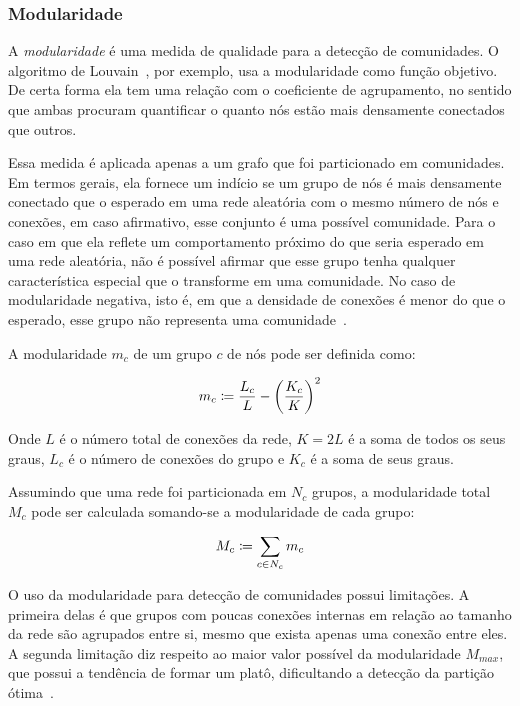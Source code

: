 \documentclass[12pt,a4paper]{article}
\begin{document}
\subsubsection{Modularidade} \label{sec:modularidade}


A \textit{modularidade} é uma medida de qualidade para a detecção de comunidades. O algoritmo de Louvain~\cite{Blondel2008-qh}, por exemplo, usa a modularidade como função objetivo. De certa forma ela tem uma relação com o coeficiente de agrupamento, no sentido que ambas procuram quantificar o quanto nós estão mais densamente conectados que outros.

Essa medida é aplicada apenas a um grafo que foi particionado em comunidades. Em termos gerais, ela fornece um indício se um grupo de nós é mais densamente conectado que o esperado em uma rede aleatória com o mesmo número de nós e conexões, em caso afirmativo, esse conjunto é uma possível comunidade. Para o caso em que ela reflete um comportamento próximo do que seria esperado em uma rede aleatória, não é possível afirmar que esse grupo tenha qualquer característica especial que o transforme em uma comunidade. No caso de modularidade negativa, isto é, em que a densidade de conexões é menor do que o esperado, esse grupo não representa uma comunidade~\cite{Barabasi2016-rn}.

A modularidade $m_c$ de um grupo $c$ de nós pode ser definida como:

\begin{equation} \label{eq:modularidade-local}
m_c \coloneqq \frac{L_c}{L} - \left( \frac{K_c}{K} \right)^2
\end{equation}

Onde $L$ é o número total de conexões da rede, $K = 2L$ é a soma de todos os seus graus, $L_c$ é o número de conexões do grupo e $K_c$ é a soma de seus graus.

Assumindo que uma rede foi particionada em $N_c$ grupos, a modularidade total $M_c$ pode ser calculada somando-se a modularidade de cada grupo:

\begin{equation} \label{eq:modularidade-global}
M_c \coloneqq \sum_{c \in N_c} m_c
\end{equation}

O uso da modularidade para detecção de comunidades possui limitações. A primeira delas é que grupos com poucas conexões internas em relação ao tamanho da rede são agrupados entre si, mesmo que exista apenas uma conexão entre eles. A segunda limitação diz respeito ao maior valor possível da modularidade $M_\textit{max}$, que possui a tendência de formar um platô, dificultando a detecção da partição ótima~\cite{Barabasi2016-rn}.
\end{document}
